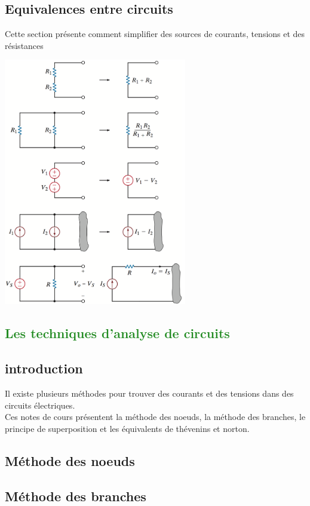 \documentclass[11pt]{report}
\begin{document}
\section{Equivalences entre circuits}
Cette section présente comment simplifier des sources de courants, tensions et des résistances
\begin{framed}
   \includegraphics[width=8cm]{8.png}\newline
\end{framed}

\textcolor{forestgreen}{\chapter{Les techniques d'analyse de circuits}}
\section{introduction}
Il existe plusieurs méthodes pour trouver des courants et des tensions dans des circuits électriques. \\
Ces notes de cours présentent la méthode des noeuds, la méthode des branches, le principe de superposition et les équivalents de thévenins et norton.
\section{Méthode des noeuds}
\begin{framed}

\end{framed}
\section{Méthode des branches}
\begin{framed}

\end{framed}
\end{document}
